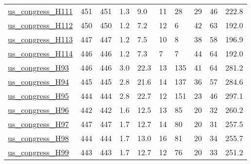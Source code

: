 \begin{longtable}{llllllllll}
 \href{https://doi.org/10.6084/m9.figshare.8096429}{us\_congress\_H111}                                                       & 451        & 451   & 1.3    & 9.0    & 11    & 28     & 29     & 46     & 222.8   \\
 \href{https://doi.org/10.6084/m9.figshare.8096429}{us\_congress\_H112}                                                       & 450        & 450   & 1.2    & 7.2    & 12    & 6      & 42     & 63     & 192.0   \\
 \href{https://doi.org/10.6084/m9.figshare.8096429}{us\_congress\_H113}                                                       & 447        & 447   & 1.2    & 7.5    & 10    & 8      & 38     & 58     & 196.9   \\
 \href{https://doi.org/10.6084/m9.figshare.8096429}{us\_congress\_H114}                                                       & 446        & 446   & 1.2    & 7.3    & 7     & 7      & 44     & 64     & 192.0   \\
 \href{https://doi.org/10.6084/m9.figshare.8096429}{us\_congress\_H93}                                                        & 446        & 446   & 3.0    & 22.3   & 13    & 135    & 41     & 64     & 281.2   \\
 \href{https://doi.org/10.6084/m9.figshare.8096429}{us\_congress\_H94}                                                        & 445        & 445   & 2.8    & 21.6   & 14    & 137    & 36     & 57     & 284.6   \\
 \href{https://doi.org/10.6084/m9.figshare.8096429}{us\_congress\_H95}                                                        & 444        & 444   & 2.8    & 22.7   & 12    & 151    & 23     & 46     & 297.1   \\
 \href{https://doi.org/10.6084/m9.figshare.8096429}{us\_congress\_H96}                                                        & 442        & 442   & 1.6    & 12.5   & 13    & 85     & 20     & 32     & 260.2   \\
 \href{https://doi.org/10.6084/m9.figshare.8096429}{us\_congress\_H97}                                                        & 447        & 447   & 1.7    & 12.7   & 14    & 80     & 20     & 31     & 257.5   \\
 \href{https://doi.org/10.6084/m9.figshare.8096429}{us\_congress\_H98}                                                        & 444        & 444   & 1.7    & 13.0   & 16    & 81     & 20     & 34     & 255.7   \\
 \href{https://doi.org/10.6084/m9.figshare.8096429}{us\_congress\_H99}                                                        & 443        & 443   & 1.7    & 12.7   & 12    & 76     & 20     & 33     & 251.2   \\

\end{longtable}
